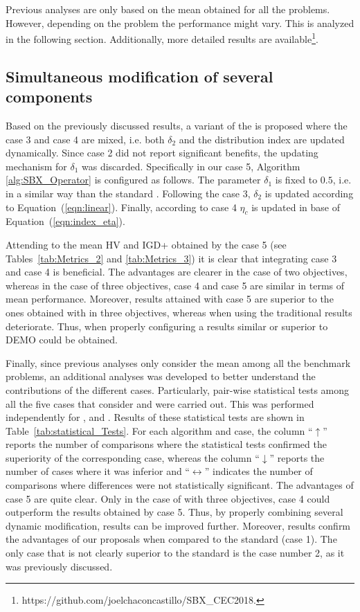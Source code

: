 Previous analyses are only based on the mean obtained for all the problems.
%
However, depending on the problem the performance might vary.
%
This is analyzed in the following section.
%
Additionally, more detailed results are available\footnote{https:\//\//github.com\//joelchaconcastillo\//SBX\_CEC2018.}.


\subsection{Simultaneous modification of several components}

Based on the previously discussed results, a variant of the \SBX{} is proposed where the case 3 and case 4 are mixed, 
i.e. both $\delta_2$ and the distribution index are updated dynamically.
%
Since case 2 did not report significant benefits, the updating mechanism for $\delta_1$ was discarded.
%
Specifically in our case 5, Algorithm \ref{alg:SBX_Operator} is configured as follows.
%
The parameter $\delta_1$ is fixed to $0.5$, i.e. in a similar way than the standard \SBX{}.
%
Following the case 3, $\delta_2$ is updated according to Equation~(\ref{eqn:linear}).
%
Finally, according to case 4 $\eta_c$ is updated in base of Equation~(\ref{eqn:index_eta}).

Attending to the mean HV and IGD+ obtained by the case 5 (see Tables~\ref{tab:Metrics_2} and \ref{tab:Metrics_3})
it is clear that integrating case 3 and case 4 is beneficial.
%
The advantages are clearer in the case of two objectives, whereas in the case of three objectives, case 4
and case 5 are similar in terms of mean performance.
%
Moreover, results attained with case 5 are superior to the ones obtained with \DE{} in three objectives, whereas
when using the traditional \SBX{} results deteriorate.
%
Thus, when properly configuring a \DSBX{} results similar or superior to DEMO could be obtained.

Finally, since previous analyses only consider the mean among all the benchmark problems, an additional analyses
was developed to better understand the contributions of the different cases.
%
Particularly, pair-wise statistical tests among all the five cases that consider \SBX{} and \DSBX{} were carried out.
%
This was performed independently for \NSGAII{}, \MOEAD{} and \SMSEMOA{}.
%
Results of these statistical tests are shown in Table~\ref{tab:statistical_Tests}.
%
For each algorithm and case, the column ``$\uparrow$'' reports the number of comparisons where the statistical tests 
confirmed the superiority of the corresponding case, whereas the column ``$\downarrow$'' reports the number of cases 
where it was inferior and ``$\longleftrightarrow$'' indicates the number of comparisons where 
differences were not statistically significant.
The advantages of case 5 are quite clear.
%
Only in the case of \NSGAII{} with three objectives, case 4 could outperform the results obtained by case 5.
%
Thus, by properly combining several dynamic modification, results can be improved further.
%
Moreover, results confirm the advantages of our proposals when compared to the standard \SBX{} (case 1).
%
The only case that is not clearly superior to the standard \SBX{} is the case number 2, as it was previously discussed.
%

